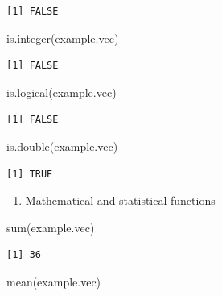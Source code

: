 \documentclass[
  letterpaper,
  DIV=11,
  numbers=noendperiod]{scrreprt}
\newenvironment{Shaded}{\begin{snugshade}}{\end{snugshade}}
\newcommand{\FunctionTok}[1]{\textcolor[rgb]{0.28,0.35,0.67}{#1}}
\newcommand{\NormalTok}[1]{\textcolor[rgb]{0.00,0.23,0.31}{#1}}
\providecommand{\tightlist}{%
  \setlength{\itemsep}{0pt}\setlength{\parskip}{0pt}}\usepackage{longtable,booktabs,array}
\begin{document}
\begin{verbatim}
[1] FALSE
\end{verbatim}

\begin{Shaded}
\begin{Highlighting}[]
\FunctionTok{is.integer}\NormalTok{(example.vec)}
\end{Highlighting}
\end{Shaded}

\begin{verbatim}
[1] FALSE
\end{verbatim}

\begin{Shaded}
\begin{Highlighting}[]
\FunctionTok{is.logical}\NormalTok{(example.vec)}
\end{Highlighting}
\end{Shaded}

\begin{verbatim}
[1] FALSE
\end{verbatim}

\begin{Shaded}
\begin{Highlighting}[]
\FunctionTok{is.double}\NormalTok{(example.vec)}
\end{Highlighting}
\end{Shaded}

\begin{verbatim}
[1] TRUE
\end{verbatim}

\begin{enumerate}
\def\labelenumi{\arabic{enumi}.}
\setcounter{enumi}{3}
\tightlist
\item
  Mathematical and statistical functions
\end{enumerate}

\begin{Shaded}
\begin{Highlighting}[]
\FunctionTok{sum}\NormalTok{(example.vec)}
\end{Highlighting}
\end{Shaded}

\begin{verbatim}
[1] 36
\end{verbatim}

\begin{Shaded}
\begin{Highlighting}[]
\FunctionTok{mean}\NormalTok{(example.vec)}
\end{Highlighting}
\end{Shaded}
\end{document}
